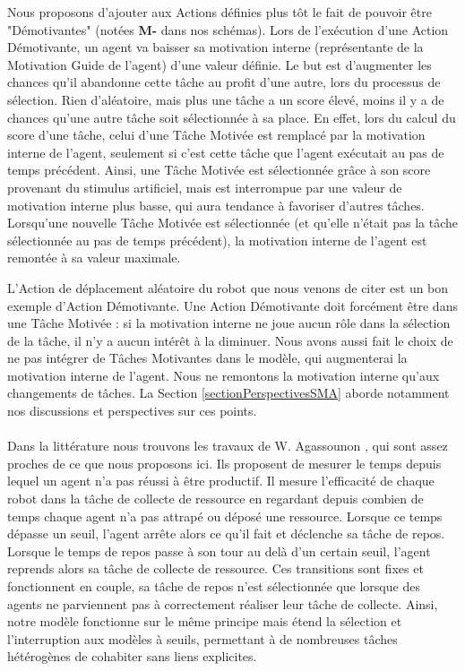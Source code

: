 			Nous proposons d'ajouter aux Actions définies plus tôt le fait de pouvoir être "Démotivantes" (notées \textbf{M-} dans nos schémas). Lors de l'exécution d'une Action Démotivante, un agent va baisser sa motivation interne (représentante de la Motivation Guide de l'agent) d'une valeur définie. Le but est d'augmenter les chances qu'il abandonne cette tâche au profit d'une autre, lors du processus de sélection. Rien d'aléatoire, mais plus une tâche a un score élevé, moins il y a de chances qu'une autre tâche soit sélectionnée à sa place. En effet, lors du calcul du score d'une tâche, celui d'une Tâche Motivée est remplacé par la motivation interne de l'agent, seulement si c'est cette tâche que l'agent exécutait au pas de temps précédent. Ainsi, une Tâche Motivée est sélectionnée grâce à son score provenant du stimulus artificiel, mais est interrompue par une valeur de motivation interne plus basse, qui aura tendance à favoriser d'autres tâches. Lorsqu'une nouvelle Tâche Motivée est sélectionnée (et qu'elle n'était pas la tâche sélectionnée au pas de temps précédent), la motivation interne de l'agent est remontée à sa valeur maximale.
			
			L'Action de déplacement aléatoire du robot que nous venons de citer est un bon exemple d'Action Démotivante. Une Action Démotivante doit forcément être dans une Tâche Motivée : si la motivation interne ne joue aucun rôle dans la sélection de la tâche, il n'y a aucun intérêt à la diminuer. Nous avons aussi fait le choix de ne pas intégrer de Tâches Motivantes dans le modèle, qui augmenterai la motivation interne de l'agent. Nous ne remontons la motivation interne qu'aux changements de tâches. La Section \ref{sectionPerspectivesSMA} aborde notamment nos discussions et perspectives sur ces points.
			
			
			\paragraph{}			
			Dans la littérature nous trouvons les travaux de W. Agassounon  \cite{agassounon_scalable_2001}, qui sont assez proches de ce que nous proposons ici. Ils proposent de mesurer le temps depuis lequel un agent n'a pas réussi à être productif. Il mesure l'efficacité de chaque robot dans la tâche de collecte de ressource en regardant depuis combien de temps chaque agent n'a pas attrapé ou déposé une ressource. Lorsque ce temps dépasse un seuil, l'agent arrête alors ce qu'il fait et déclenche sa tâche de repos. Lorsque le temps de repos passe à son tour au delà d'un certain seuil, l'agent reprends alors sa tâche de collecte de ressource. Ces transitions sont fixes et fonctionnent en couple, sa tâche de repos n'est sélectionnée que lorsque des agents ne parviennent pas à correctement réaliser leur tâche de collecte. Ainsi, notre modèle fonctionne sur le même principe mais étend la sélection et l'interruption aux modèles à seuils, permettant à de nombreuses tâches hétérogènes de cohabiter sans liens explicites.
			

